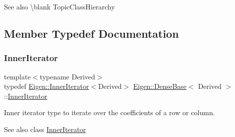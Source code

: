\begin{DoxySeeAlso}{See also}
\textbackslash{}blank Topic\+Class\+Hierarchy 
\end{DoxySeeAlso}


\subsection{Member Typedef Documentation}
\mbox{\label{class_eigen_1_1_dense_base_a4dc102b445d8fb48a28dfcd22323f649}} 
\subsubsection{\texorpdfstring{InnerIterator}{InnerIterator}}
{\footnotesize\ttfamily template$<$typename Derived$>$ \\
typedef \mbox{\hyperlink{class_eigen_1_1_inner_iterator}{Eigen\+::\+Inner\+Iterator}}$<$Derived$>$ \mbox{\hyperlink{class_eigen_1_1_dense_base}{Eigen\+::\+Dense\+Base}}$<$ Derived $>$\+::\mbox{\hyperlink{class_eigen_1_1_dense_base_a4dc102b445d8fb48a28dfcd22323f649}{Inner\+Iterator}}}

Inner iterator type to iterate over the coefficients of a row or column. \begin{DoxySeeAlso}{See also}
class \mbox{\hyperlink{class_eigen_1_1_inner_iterator}{Inner\+Iterator}} 
\end{DoxySeeAlso}
\mbox{\label{class_eigen_1_1_dense_base_a65328b7d6fc10a26ff6cd5801a6a44eb}} 
